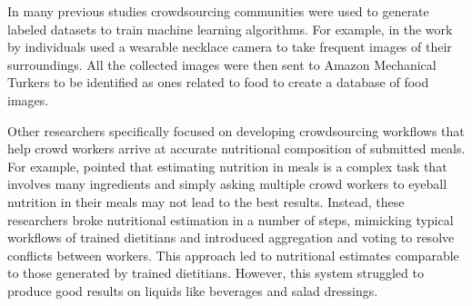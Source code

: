 

In many previous studies crowdsourcing communities were used to generate labeled datasets to train machine learning algorithms. For example, in the work by \cite{Thomaz:2013:FIE:2526667.2526672} individuals used a wearable necklace camera to take frequent images of their surroundings. All the collected images were then sent to Amazon Mechanical Turkers to be identified as ones related to food to create a database of food images.

Other researchers specifically focused on developing crowdsourcing workflows that help crowd workers arrive at accurate nutritional composition of submitted meals. For example, \cite{noronha2011platemate} pointed that estimating nutrition in meals is a complex task that involves many ingredients and simply asking multiple crowd workers to eyeball nutrition in their meals may not lead to the best results. Instead, these researchers broke nutritional estimation in a number of steps, mimicking typical workflows of trained dietitians and introduced aggregation and voting to resolve conflicts between workers. This approach led to nutritional estimates comparable to those generated by trained dietitians. However, this system struggled to produce good results on liquids like beverages and salad dressings.

